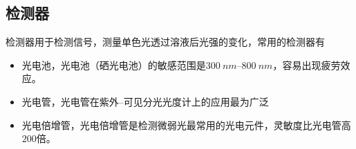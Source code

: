 \subsection{检测器}
检测器用于检测信号，测量单色光透过溶液后光强的变化，常用的检测器有
\begin{itemize}
    \item 光电池，光电池（硒光电池）的敏感范围是$\SIrange{300}{800}{nm}$，容易出现疲劳效应。
    \item 光电管，光电管在紫外--可见分光光度计上的应用最为广泛
    \item 光电倍增管，光电倍增管是检测微弱光最常用的光电元件，灵敏度比光电管高$200$倍。
\end{itemize}